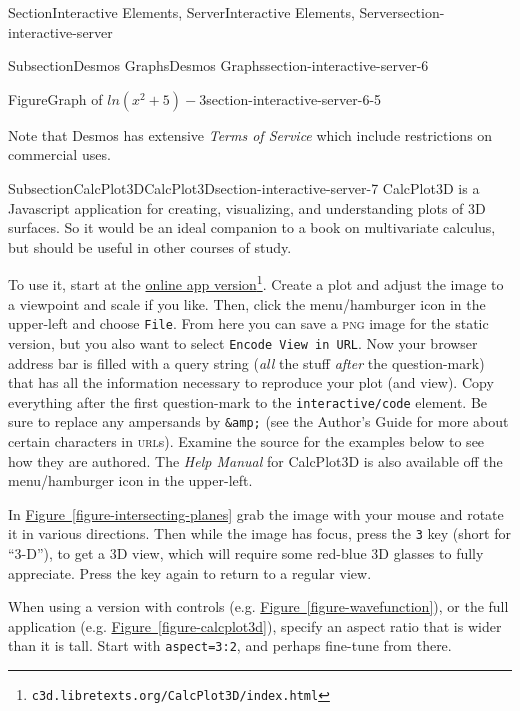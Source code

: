 \documentclass[twoside,10pt,]{article}
\newcommand{\xreffont}{\relax}
\newcommand{\mono}[1]{\texttt{#1}}
\newcommand{\initialism}[1]{\textsc{\MakeLowercase{#1}}}
\newcommand{\pubtitle}[1]{\textsl{#1}}
\numberwithin{equation}{section}
\begin{document}
\begin{sectionptx}{Section}{Interactive Elements, Server}{}{Interactive Elements, Server}{}{}{section-interactive-server}
\begin{subsectionptx}{Subsection}{Desmos Graphs}{}{Desmos Graphs}{}{}{section-interactive-server-6}
\begin{figureptx}{Figure}{Graph of \(ln(x^2+5)-3\)}{section-interactive-server-6-5}{}
\tcblower
\end{figureptx}%
Note that Desmos has extensive \pubtitle{Terms of Service} which include restrictions on commercial uses.%
\end{subsectionptx}
%
%
\typeout{************************************************}
\typeout{************************************************}
%
\begin{subsectionptx}{Subsection}{CalcPlot3D}{}{CalcPlot3D}{}{}{section-interactive-server-7}
%
CalcPlot3D is a Javascript application for creating, visualizing, and understanding plots of 3D surfaces.  So it would be an ideal companion to a book on multivariate calculus, but should be useful in other courses of study.%
\par
To use it, start at the \href{https://c3d.libretexts.org/CalcPlot3D/index.html}{online app version}\footnote{\nolinkurl{c3d.libretexts.org/CalcPlot3D/index.html}\label{section-interactive-server-7-4-2}}.  Create a plot and adjust the image to a viewpoint and scale if you like.  Then, click the menu\slash{}hamburger icon in the upper-left and choose \mono{File}.  From here you can save a \initialism{PNG} image for the static version, but you also want to select \mono{Encode View in URL}.  Now your browser address bar is filled with a query string (\emph{all} the stuff \emph{after} the question-mark) that has all the information necessary to reproduce your plot (and view).  Copy everything after the first question-mark to the \mono{interactive/code} element.  Be sure to replace any ampersands by \mono{\&amp;} (see the Author's Guide for more about certain characters in \initialism{URL}s).  Examine the source for the examples below to see how they are authored.  The \pubtitle{Help Manual} for CalcPlot3D is also available off the menu\slash{}hamburger icon in the upper-left.%
\par
In \hyperref[figure-intersecting-planes]{Figure~{\xreffont\ref{figure-intersecting-planes}}} grab the image with your mouse and rotate it in various directions.  Then while the image has focus, press the \mono{3} key (short for ``3-D''), to get a 3D view, which will require some red-blue 3D glasses to fully appreciate.  Press the key again to return to a regular view.%
\par
When using a version with controls (e.g. \hyperref[figure-wavefunction]{Figure~{\xreffont\ref{figure-wavefunction}}}), or the full application (e.g. \hyperref[figure-calcplot3d]{Figure~{\xreffont\ref{figure-calcplot3d}}}), specify an aspect ratio that is wider than it is tall.  Start with \mono{aspect=\textquotedbl{}3:2\textquotedbl{}}, and perhaps fine-tune from there.%

\end{subsectionptx}
\end{sectionptx}
\end{document}
